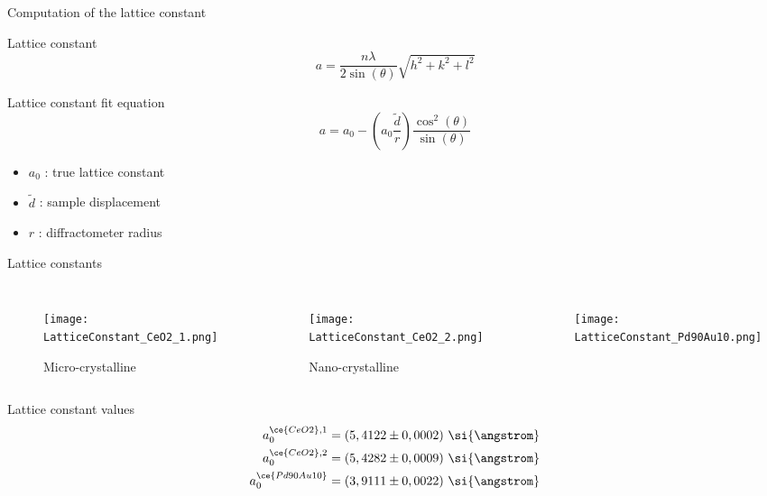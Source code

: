\documentclass{beamer}
\begin{document}
\begin{frame}{Computation of the lattice constant}
    \begin{alertblock}{Lattice constant}
        \begin{equation*}
            a = \frac{n \lambda}{2 \sin(\theta)}\sqrt{h^2 + k^2 + l^2}
        \end{equation*}
    \end{alertblock}
    \begin{exampleblock}{Lattice constant fit equation}
        \begin{equation*}
            a = a_0 - \left( a_0 \frac{\tilde{d}}{r} \right) \frac{\cos^2(\theta)}{\sin(\theta)}
        \end{equation*}
        \begin{itemize}
            \item $a_0$ : true lattice constant
            \item $\tilde{d}$ : sample displacement
            \item $r$ : diffractometer radius
        \end{itemize}
    \end{exampleblock}
\end{frame}

\begin{frame}{Lattice constants}
    \vspace{-1.2cm}
     \begin{columns}
        \begin{figure}
            \centering\texttt{[image: LatticeConstant\_CeO2\_1.png]}
            \caption{Micro-crystalline }
        \end{figure}
        \begin{figure}
            \centering\texttt{[image: LatticeConstant\_CeO2\_2.png]}
            \caption{Nano-crystalline }
        \end{figure}
        \begin{figure}
            \centering
            \texttt{[image: LatticeConstant\_Pd90Au10.png]}
            \caption{}
        \end{figure}
    \end{columns}
    \vspace{-0.5cm}
     \begin{block}{Lattice constant values}
        \begin{align*}
            a_0^{\ce{CeO2},1} &= (5,4122 \pm 0,0002) \ \si{\angstrom} \\
            a_0^{\ce{CeO2},2} &= (5,4282 \pm 0,0009) \ \si{\angstrom} \\
            a_0^{\ce{Pd90Au10}} &= (3,9111 \pm 0,0022) \ \si{\angstrom}
        \end{align*}
    \end{block}
\end{frame}
\end{document}
